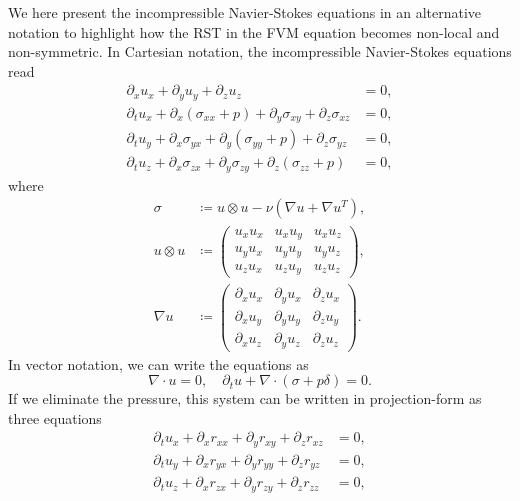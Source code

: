 \documentclass[preprint,twocolumn,5p]{elsarticle}
\begin{document}
We here present the incompressible Navier-Stokes equations in an alternative
notation to highlight how the RST in the FVM equation becomes non-local and non-symmetric. 
In Cartesian notation, the incompressible Navier-Stokes equations read
\begin{align}
    \partial_x u_x + \partial_y u_y + \partial_z u_z & = 0, \\
    \partial_t u_x + \partial_x \left( \sigma_{x x} + p \right) + \partial_y \sigma_{x y} + \partial_z \sigma_{x z} & = 0, \\
    \partial_t u_y + \partial_x \sigma_{y x} + \partial_y \left( \sigma_{y y} + p \right) + \partial_z \sigma_{y z} & = 0, \\
    \partial_t u_z + \partial_x \sigma_{z x} + \partial_y \sigma_{z y} + \partial_z \left( \sigma_{z z} + p \right) & = 0,
\end{align}
where
\begin{align}
    \sigma
    & \coloneq u \otimes u - \nu \left( \nabla u + \nabla u^T \right), \\
    u \otimes u
    & \coloneq \begin{pmatrix}
        u_x u_x & u_x u_y & u_x u_z \\
        u_y u_x & u_y u_y & u_y u_z \\
        u_z u_x & u_z u_y & u_z u_z
    \end{pmatrix}, \\
    \nabla u
    & \coloneq \begin{pmatrix}
        \partial_x u_x & \partial_y u_x & \partial_z u_x \\
        \partial_x u_y & \partial_y u_y & \partial_z u_y \\
        \partial_x u_z & \partial_y u_z & \partial_z u_z
    \end{pmatrix}.
\end{align}
In vector notation, we can write the equations as
\begin{equation}
    \nabla \cdot u = 0, \quad \partial_t u + \nabla \cdot
    \left( \sigma + p \delta \right) = 0.
\end{equation}
If we eliminate the pressure, this system can be written in projection-form as
three equations
\begin{align}
    \partial_t u_x +
    \partial_x r_{x x} +
    \partial_y r_{x y} +
    \partial_z r_{x z}
    & = 0, \\
    \partial_t u_y +
    \partial_x r_{y x} +
    \partial_y r_{y y} +
    \partial_z r_{y z}
    & = 0, \\
    \partial_t u_z +
    \partial_x r_{z x} +
    \partial_y r_{z y} +
    \partial_z r_{z z}
    & = 0,
\end{align}
\end{document}
